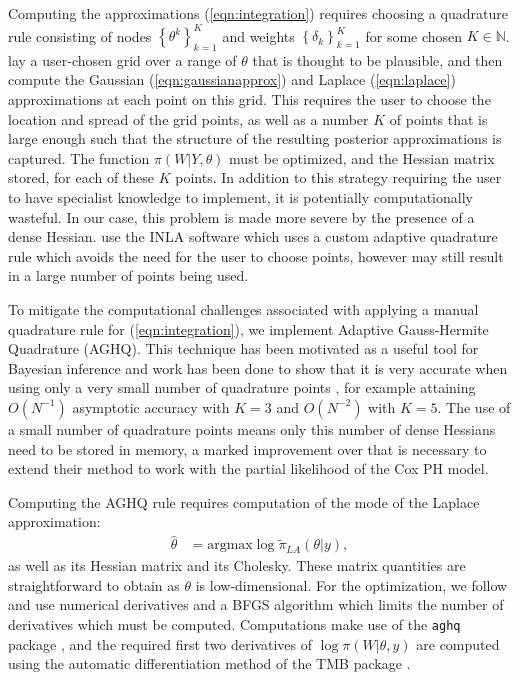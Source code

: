 \documentclass[ba]{imsart}
\begin{document}
Computing the approximations (\ref{eqn:integration}) requires choosing a quadrature rule consisting of nodes $\left\{\theta^{k}\right\}_{k=1}^{K}$ and weights $\left\{\delta_{k}\right\}_{k=1}^{K}$ for some chosen $K\in\mathbb{N}$. \cite{casecross} lay a user-chosen grid over a range of $\theta$ that is thought to be plausible, and then compute the Gaussian (\ref{eqn:gaussianapprox}) and Laplace (\ref{eqn:laplace}) approximations at each point on this grid. This requires the user to choose the location and spread of the grid points, as well as a number $K$
of points that is large enough such that the structure of the resulting posterior approximations is captured. The function $\pi(W|Y,\theta)$ must be optimized, and the Hessian matrix stored, for each of these $K$ points. In addition to this strategy requiring the user to have specialist knowledge to implement, it is potentially computationally wasteful. In our case, this problem is made more severe by the presence of a dense Hessian. \cite{inlacoxph} use the INLA software which uses a custom adaptive quadrature rule which avoids the need for the user to choose points, however may still result in a large number of points being used.

To mitigate the computational challenges associated with applying a manual quadrature rule for (\ref{eqn:integration}), we implement Adaptive Gauss-Hermite Quadrature (AGHQ). This technique has been motivated as a useful tool for Bayesian inference \citep{nayloradaptive} and work has been done to show that it is very accurate when using only a very small number of quadrature points \citep{adaptive_GH_1994,adaptive_GH_2020}, for example attaining $O(N^{-1})$ asymptotic accuracy with $K = 3$ and $O(N^{-2})$ with $K = 5$. The use of a small number of quadrature points means only this number of dense Hessians need to be stored in memory, a marked improvement over \cite{casecross} that is necessary to extend their method to work with the partial likelihood of the Cox PH model.

Computing the AGHQ rule requires computation of the mode of the Laplace approximation:
\begin{equation}\begin{aligned}
\widehat{\theta} &= \text{argmax}\log\widetilde{\pi}_{LA}(\theta|y),
\end{aligned}\end{equation}
as well as its Hessian matrix and its Cholesky. These matrix quantities are straightforward to obtain as $\theta$ is low-dimensional. For the optimization, we follow \citet{inla} and use numerical derivatives and a BFGS algorithm which limits the number of derivatives which must be computed. Computations make use of the \texttt{aghq} package \citep{stringeraghqpackage}, and the required first two derivatives of $\log\pi(W|\theta,y)$ are computed using the automatic differentiation method of the TMB package \citep{tmb}.
\end{document}
